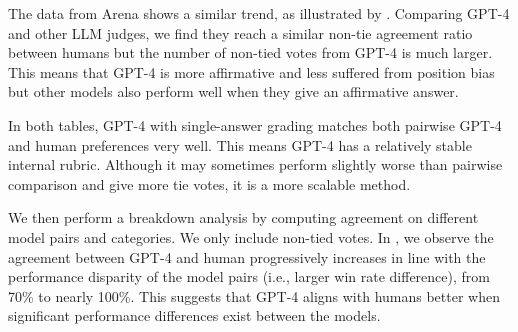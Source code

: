 The data from Arena shows a similar trend, as illustrated by . Comparing GPT-4 and other LLM judges, we find they reach a similar non-tie agreement ratio between humans but the number of non-tied votes from GPT-4 is much larger. This means that GPT-4 is more affirmative and less suffered from position bias but other models also perform well when they give an affirmative answer.

In both tables, GPT-4 with single-answer grading matches both pairwise GPT-4 and human preferences very well.
This means GPT-4 has a relatively stable internal rubric.
Although it may sometimes perform slightly worse than pairwise comparison and give more tie votes, it is a more scalable method.


We then perform a breakdown analysis by computing agreement on different model pairs and categories.
We only include non-tied votes.
In , we observe the agreement between GPT-4 and human progressively increases in line with the performance disparity of the model pairs (i.e., larger win rate difference), from 70\% to nearly 100\%. This suggests that GPT-4 aligns with humans better when significant performance differences exist between the models.


\vspace{2em}



\begin{table}[H]
\centering
\caption{Category-wise win rate of models.}
\label{table:win_rate_category}
\footnotesize
{}
\end{table}


